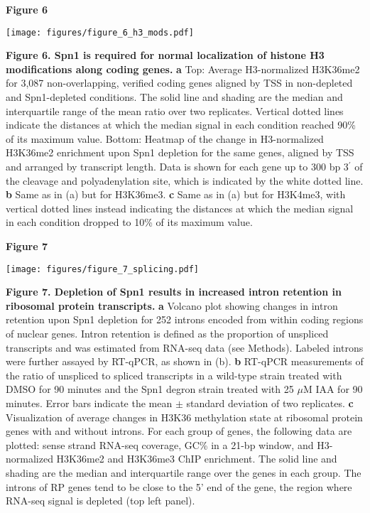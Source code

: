 \documentclass[8pt]{extarticle}
\begin{document}
\newpage

\textbf{\large Figure 6}

\texttt{[image: figures/figure\_6\_h3\_mods.pdf]}

\vspace{2em}
\textbf{Figure 6. Spn1 is required for normal localization of histone H3 modifications along coding genes.}
\textbf{a} Top: Average H3-normalized H3K36me2 for 3,087 non-overlapping, verified coding genes aligned by TSS in non-depleted and Spn1-depleted conditions.
The solid line and shading are the median and interquartile range of the mean ratio over two replicates.
Vertical dotted lines indicate the distances at which the median signal in each condition reached 90\% of its maximum value.
Bottom: Heatmap of the change in H3-normalized H3K36me2 enrichment upon Spn1 depletion for the same genes, aligned by TSS and arranged by transcript length.
Data is shown for each gene up to 300 bp 3$^\prime$ of the cleavage and polyadenylation site, which is indicated by the white dotted line.
\textbf{b} Same as in (a) but for H3K36me3.
\textbf{c} Same as in (a) but for H3K4me3, with vertical dotted lines instead indicating the distances at which the median signal in each condition dropped to 10\% of its maximum value.

\newpage

\textbf{\large Figure 7}

\texttt{[image: figures/figure\_7\_splicing.pdf]}

\vspace{2em}
\textbf{Figure 7. Depletion of Spn1 results in increased intron retention in ribosomal protein transcripts.}
\textbf{a} Volcano plot showing changes in intron retention upon Spn1 depletion for 252 introns encoded from within coding regions of nuclear genes.
Intron retention is defined as the proportion of unspliced transcripts and was estimated from RNA-seq data (see Methods).
Labeled introns were further assayed by RT-qPCR, as shown in (b).
\textbf{b} RT-qPCR measurements of the ratio of unspliced to spliced transcripts in a wild-type strain treated with DMSO for 90 minutes and the Spn1 degron strain treated with 25 $\mu$M IAA for 90 minutes.
Error bars indicate the mean $\pm$ standard deviation of two replicates.
\textbf{c} Visualization of average changes in H3K36 methylation state at ribosomal protein genes with and without introns.
For each group of genes, the following data are plotted: sense strand RNA-seq coverage, GC\% in a 21-bp window, and H3-normalized H3K36me2 and H3K36me3 ChIP enrichment.
The solid line and shading are the median and interquartile range over the genes in each group.
The introns of RP genes tend to be close to the 5’ end of the gene, the region where RNA-seq signal is depleted (top left panel).
\end{document}
